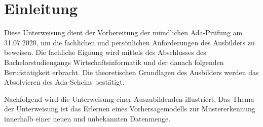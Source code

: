 \acresetall 

\chapter{Einleitung}
Diese Unterweisung dient der Vorbereitung der mündlichen Ada-Prüfung am 31.07.2020, um die fachlichen und persönlichen Anforderungen des Ausbilders zu beweisen. Die fachliche Eignung wird mittels des Abschlusses des Bachelorstudiengangs Wirtschaftsinformatik und der danach folgenden Berufstätigkeit erbracht. Die theoretischen Grundlagen des Ausbilders werden das Absolvieren des Ada-Scheins bestätigt. 
\par
Nachfolgend wird die Unterweisung einer Auszubildenden illustriert. Das Thema der Unterweisung ist das Erlernen eines Vorhersagemodells zur Mustererkennung innerhalb einer neuen und unbekannten Datenmenge. 


